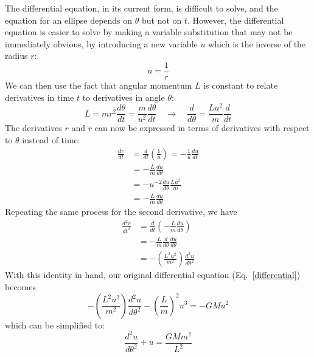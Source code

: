 \documentclass[11pt]{article}
\begin{document}
The differential equation, in its current form, is difficult to solve, and the
equation for an ellipse depends on $\theta$ but not on $t$. However, the
differential equation is easier to solve by making a variable substitution that
may not be immediately obvious, by introducing a new variable $u$ which is
the inverse of the radius $r$:
\begin{equation}
  u=\frac{1}{r}
\end{equation}
We can then use the fact that angular momentum $L$ is constant to relate
derivatives in time $t$ to derivatives in angle $\theta$:
\begin{equation}
  L=mr^2\frac{d\theta}{dt}=\frac{m}{u^2}\frac{d\theta}{dt}
  \quad\longrightarrow\quad
  \frac{d}{d\theta}=\frac{Lu^2}{m}\frac{d}{dt}
\end{equation}
The derivatives $\dot{r}$ and $\ddot{r}$ can now be expressed in terms of
derivatives with respect to $\theta$ instead of time:
\begin{align}
  \frac{dr}{dt} &=\frac{d}{dt}\left(\frac{1}{u}\right)
  =-\frac{1}{u}\frac{du}{dt}\\
  &=-\frac{L}{m}\frac{du}{d\theta}\\
  &= -u^{-2}\frac{du}{d\theta} \frac{Lu^2}{m} \\
  &= -\frac{L}{m}\frac{du}{d\theta}
\end{align}
Repeating the same process for the second derivative, we have
\begin{align}
  \frac{d^2r}{dt^2} &= \frac{d}{dt}\left(-\frac{L}{m}\frac{du}{d\theta}\right)\\
  &= -\frac{L}{m} \frac{d}{d\theta}\frac{du}{d\theta} \\
  &= -\left(\frac{L^2u^2}{m^2}\right)\frac{d^2u}{d\theta^2}
\end{align}
With this identity in hand, our original differential equation
(Eq.\ \ref{differential}) becomes
\begin{equation}
  -\left(\frac{L^2u^2}{m^2}\right)\frac{d^2u}{d\theta^2} - \left(\frac{L}{m}\right)^2u^3 = -GMu^2
\end{equation}
which can be simplified to:
\begin{equation}
  \frac{d^2u}{d\theta^2} + u = \frac{GMm^2}{L^2}
  \label{newdiff}
\end{equation}
\end{document}
